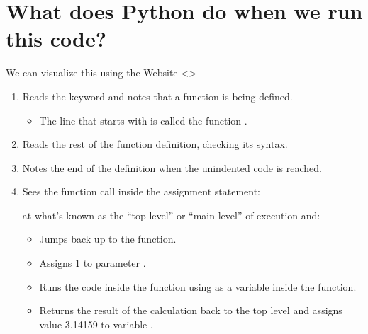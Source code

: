 \documentclass[letterpaper,10pt,english]{sphinxmanual}
\begin{document}
\section{What does Python do when we run this code?}
\label{\detokenize{lecture_notes/lec05_functions2:what-does-python-do-when-we-run-this-code}}
We can visualize this using the Website \textless{}\textgreater{}
\begin{enumerate}
\def\theenumi{\arabic{enumi}}
\def\labelenumi{\theenumi .}
\makeatletter\def\p@enumii{\p@enumi \theenumi .}\makeatother
\item {} 
Reads the keyword  and notes that a function is being defined.
\begin{itemize}
\item {} 
The line that starts with  is called the function .

\end{itemize}

\item {} 
Reads the rest of the function definition, checking its syntax.

\item {} 
Notes the end of the definition when the unindented code is reached.

\item {} 
Sees the function call inside the assignment statement:

\begin{sphinxVerbatim}[commandchars=\\\{\}]
  
\end{sphinxVerbatim}

at what’s known as the “top level” or “main level” of execution
and:
\begin{itemize}
\item {} 
Jumps back up to the function.

\item {} 
Assigns 1 to parameter .

\item {} 
Runs the code inside the function using  as a variable
inside the function.

\item {} 
Returns the result of the calculation back to the top level and
assigns value 3.14159 to variable .


\end{itemize}
\end{enumerate}
\end{document}
